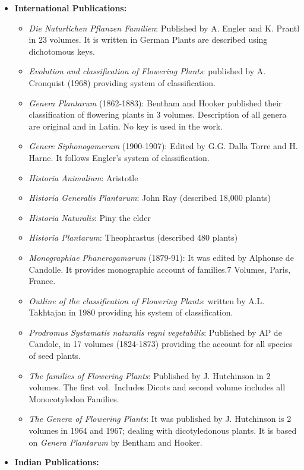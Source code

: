 \documentclass[
]{book}
\providecommand{\tightlist}{%
  \setlength{\itemsep}{0pt}\setlength{\parskip}{0pt}}
\begin{document}
\begin{itemize}
\item
  \textbf{International Publications:}

  \begin{itemize}
  \tightlist
  \item
    \emph{Die Naturlichen Pflanzen Familien}: Published by A. Engler and K. Prantl in 23 volumes. It is written in German Plants are described using dichotomous keys.
  \item
    \emph{Evolution and classification of Flowering Plants}: published by A. Cronquist (1968) providing system of classification.
  \item
    \emph{Genera Plantarum} (1862-1883): Bentham and Hooker published their classification of flowering plants in 3 volumes. Description of all genera are original and in Latin. No key is used in the work.
  \item
    \emph{Genere Siphonogamerum} (1900-1907): Edited by G.G. Dalla Torre and H. Harne. It follows Engler's system of classification.
  \item
    \emph{Historia Animalium}: Aristotle
  \item
    \emph{Historia Generalis Plantarum}: John Ray (described 18,000 plants)
  \item
    \emph{Historia Naturalis}: Piny the elder
  \item
    \emph{Historia Plantarum}: Theophrastus (described 480 plants)
  \item
    \emph{Monographiae Phanerogamarum} (1879-91): It was edited by Alphonse de Candolle. It provides monographic account of families.7 Volumes, Paris, France.
  \item
    \emph{Outline of the classification of Flowering Plants}: written by A.L. Takhtajan in 1980 providing his system of classification.
  \item
    \emph{Prodromus Systamatis naturalis regni vegetabilis}: Published by AP de Candole, in 17 volumes (1824-1873) providing the account for all species of seed plants.
  \item
    \emph{The families of Flowering Plants}: Published by J. Hutchinson in 2 volumes. The first vol.~Includes Dicots and second volume includes all Monocotyledon Families.
  \item
    \emph{The Genera of Flowering Plants}: It was published by J. Hutchinson is 2 volumes in 1964 and 1967; dealing with dicotyledonous plants. It is based on \emph{Genera Plantarum} by Bentham and Hooker.
  \end{itemize}
\item
  \textbf{Indian Publications:}


\end{itemize}
\end{document}
